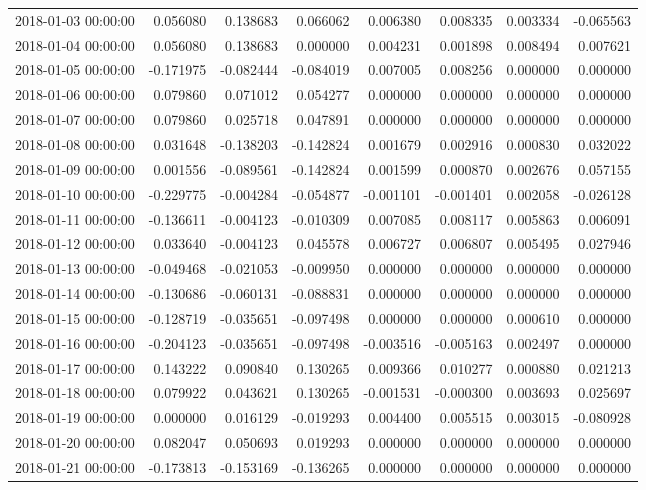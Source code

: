 \begin{tabular}{lrrrrrrr}
2018-01-03 00:00:00 & 0.056080 & 0.138683 & 0.066062 & 0.006380 & 0.008335 & 0.003334 & -0.065563 \\
2018-01-04 00:00:00 & 0.056080 & 0.138683 & 0.000000 & 0.004231 & 0.001898 & 0.008494 & 0.007621 \\
2018-01-05 00:00:00 & -0.171975 & -0.082444 & -0.084019 & 0.007005 & 0.008256 & 0.000000 & 0.000000 \\
2018-01-06 00:00:00 & 0.079860 & 0.071012 & 0.054277 & 0.000000 & 0.000000 & 0.000000 & 0.000000 \\
2018-01-07 00:00:00 & 0.079860 & 0.025718 & 0.047891 & 0.000000 & 0.000000 & 0.000000 & 0.000000 \\
2018-01-08 00:00:00 & 0.031648 & -0.138203 & -0.142824 & 0.001679 & 0.002916 & 0.000830 & 0.032022 \\
2018-01-09 00:00:00 & 0.001556 & -0.089561 & -0.142824 & 0.001599 & 0.000870 & 0.002676 & 0.057155 \\
2018-01-10 00:00:00 & -0.229775 & -0.004284 & -0.054877 & -0.001101 & -0.001401 & 0.002058 & -0.026128 \\
2018-01-11 00:00:00 & -0.136611 & -0.004123 & -0.010309 & 0.007085 & 0.008117 & 0.005863 & 0.006091 \\
2018-01-12 00:00:00 & 0.033640 & -0.004123 & 0.045578 & 0.006727 & 0.006807 & 0.005495 & 0.027946 \\
2018-01-13 00:00:00 & -0.049468 & -0.021053 & -0.009950 & 0.000000 & 0.000000 & 0.000000 & 0.000000 \\
2018-01-14 00:00:00 & -0.130686 & -0.060131 & -0.088831 & 0.000000 & 0.000000 & 0.000000 & 0.000000 \\
2018-01-15 00:00:00 & -0.128719 & -0.035651 & -0.097498 & 0.000000 & 0.000000 & 0.000610 & 0.000000 \\
2018-01-16 00:00:00 & -0.204123 & -0.035651 & -0.097498 & -0.003516 & -0.005163 & 0.002497 & 0.000000 \\
2018-01-17 00:00:00 & 0.143222 & 0.090840 & 0.130265 & 0.009366 & 0.010277 & 0.000880 & 0.021213 \\
2018-01-18 00:00:00 & 0.079922 & 0.043621 & 0.130265 & -0.001531 & -0.000300 & 0.003693 & 0.025697 \\
2018-01-19 00:00:00 & 0.000000 & 0.016129 & -0.019293 & 0.004400 & 0.005515 & 0.003015 & -0.080928 \\
2018-01-20 00:00:00 & 0.082047 & 0.050693 & 0.019293 & 0.000000 & 0.000000 & 0.000000 & 0.000000 \\
2018-01-21 00:00:00 & -0.173813 & -0.153169 & -0.136265 & 0.000000 & 0.000000 & 0.000000 & 0.000000 \\

\end{tabular}
